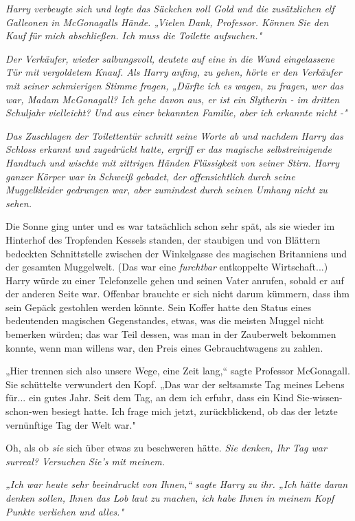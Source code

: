 {\emph{Harry verbeugte sich und legte das Säckchen voll Gold und die zusätzlichen elf Galleonen in McGonagalls Hände. „Vielen Dank, Professor. Können Sie den Kauf für mich abschließen. Ich muss die Toilette aufsuchen."}

\emph{Der Verkäufer, wieder salbungsvoll, deutete auf eine in die Wand eingelassene Tür mit vergoldetem Knauf. Als Harry anfing, zu gehen, hörte er den Verkäufer mit seiner schmierigen Stimme fragen, „Dürfte ich es wagen, zu fragen, wer das war, Madam McGonagall? Ich gehe davon aus, er ist ein Slytherin - im dritten Schuljahr vielleicht? Und aus einer bekannten Familie, aber ich erkannte nicht -"}

\emph{Das Zuschlagen der Toilettentür schnitt seine Worte ab und nachdem Harry das Schloss erkannt und zugedrückt hatte, ergriff er das magische selbstreinigende Handtuch und wischte mit zittrigen Händen Flüssigkeit von seiner Stirn. Harry ganzer Körper war in Schweiß gebadet, der} \emph{offensichtlich durch seine Muggelkleider gedrungen war, aber zumindest durch seinen Umhang nicht zu sehen.}

Die Sonne ging unter und es war tatsächlich schon sehr spät, als sie wieder im Hinterhof des Tropfenden Kessels standen, der staubigen und von Blättern bedeckten Schnittstelle zwischen der Winkelgasse des magischen Britanniens und der gesamten Muggelwelt. (Das war eine \emph{furchtbar} entkoppelte Wirtschaft...) Harry würde zu einer Telefonzelle gehen und seinen Vater anrufen, sobald er auf der anderen Seite war. Offenbar brauchte er sich nicht darum kümmern, dass ihm sein Gepäck gestohlen werden könnte. Sein Koffer hatte den Status eines bedeutenden magischen Gegenstandes, etwas, was die meisten Muggel nicht bemerken würden; das war Teil dessen, was man in der Zauberwelt bekommen konnte, wenn man willens war, den Preis eines Gebrauchtwagens zu zahlen.

„Hier trennen sich also unsere Wege, eine Zeit lang,“ sagte Professor McGonagall. Sie schüttelte verwundert den Kopf. „Das war der seltsamste Tag meines Lebens für... ein gutes Jahr. Seit dem Tag, an dem ich erfuhr, dass ein Kind Sie-wissen-schon-wen besiegt hatte. Ich frage mich jetzt, zurückblickend, ob das der letzte vernünftige Tag der Welt war."

Oh, als ob \emph{sie} sich über etwas zu beschweren hätte. \emph{Sie denken, Ihr Tag war surreal? Versuchen Sie's mit meinem.}

\emph{„Ich war heute sehr beeindruckt von Ihnen,“ sagte Harry zu ihr. „Ich hätte daran denken sollen, Ihnen das Lob laut zu machen, ich habe Ihnen in meinem Kopf Punkte verliehen und alles."}

}
